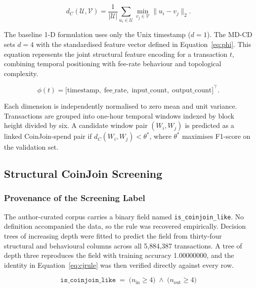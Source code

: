 \documentclass[12pt,a4paper]{article}
\begin{document}
\begin{equation}
  d_C(\mathcal{U},\mathcal{V})
    = \frac{1}{|\mathcal{U}|}
      \sum_{u_i \in \mathcal{U}}
      \min_{v_j \in \mathcal{V}} \|u_i - v_j\|_2.
  \label{eq:chamfer}
\end{equation}

The baseline 1-D formulation uses only the Unix timestamp
($d=1$). The MD-CD sets $d=4$ with the standardised feature
vector defined in Equation~\eqref{eq:phi}. This equation
represents the joint structural feature encoding for a
transaction $t$, combining temporal positioning with
fee-rate behaviour and topological complexity.

\begin{equation}
  \phi(t) = \bigl[
    \text{timestamp},\;
    \text{fee\_rate},\;
    \text{input\_count},\;
    \text{output\_count}
  \bigr]^\top.
  \label{eq:phi}
\end{equation}

Each dimension is independently normalised to zero mean
and unit variance. Transactions are grouped into one-hour
temporal windows indexed by block height divided by six.
A candidate window pair $(W_i, W_j)$ is predicted as a
linked CoinJoin-spend pair if $d_C(W_i, W_j) < \theta^*$,
where $\theta^*$ maximises F1-score on the validation set.

\subsection{Structural CoinJoin Screening}
\label{sec:screening}

\subsubsection{Provenance of the Screening Label}

The author-curated corpus carries a binary field named
\texttt{is\_coinjoin\_like}. No definition accompanied the data,
so the rule was recovered empirically. Decision trees of
increasing depth were fitted to predict the field from
thirty-four structural and behavioural columns across all
5{,}884{,}387 transactions. A tree of depth three reproduces the
field with training accuracy 1.00000000, and the identity in
Equation~\eqref{eq:cjrule} was then verified directly against
every row.

\begin{equation}
  \texttt{is\_coinjoin\_like} \;=\;
  \bigl(n_{\text{in}} \geq 4\bigr) \;\wedge\;
  \bigl(n_{\text{out}} \geq 4\bigr)
  \label{eq:cjrule}
\end{equation}
\end{document}
